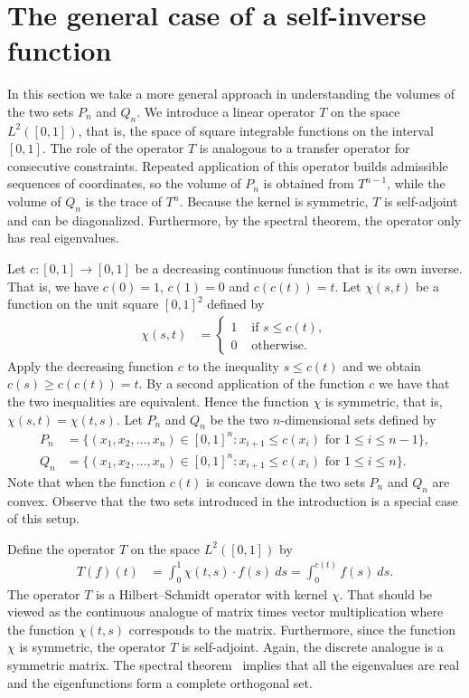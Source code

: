 \documentclass[11pt,reqno]{amsart}
\theoremstyle{definition}
\numberwithin{equation}{section}
\begin{document}
\section{The general case of a self-inverse function}
\label{section_general}

In this section we take a more general approach in understanding the
volumes of the two sets $P_{n}$ and $Q_{n}$.
We introduce a linear operator $T$ on the space $L^{2}([0,1])$,
that is, the space of square integrable functions on the interval $[0,1]$.
The role of the operator $T$ is analogous to a transfer operator for consecutive constraints.
Repeated application of this operator builds admissible sequences of coordinates,
so the volume of $P_{n}$ is obtained from $T^{n-1}$,
while the volume of $Q_{n}$ is the trace of $T^{n}$.
Because the kernel is symmetric, $T$ is self-adjoint and can be diagonalized.
Furthermore, by the spectral theorem, the operator only has
real eigenvalues.


Let $c: [0,1] \longrightarrow [0,1]$ be a decreasing
continuous function that is its own inverse.
That is, we have
$c(0) = 1$,
$c(1) = 0$
and
$c(c(t)) = t$.
Let $\chi(s,t)$ be a function on
the unit square $[0,1]^{2}$ defined by
\begin{align*}
\chi(s,t)
& =
\begin{cases}
1 & \text{ if } s \leq c(t) , \\
0 & \text{ otherwise. }
\end{cases}
\end{align*}
Apply the decreasing function $c$ to the inequality $s \leq c(t)$
and we obtain $c(s) \geq c(c(t)) = t$. 
By a second application of the function $c$ we have that the two inequalities are equivalent.
Hence the function $\chi$ is symmetric,
that is,
$\chi(s,t) = \chi(t,s)$.
Let $P_{n}$ and $Q_{n}$ be the two $n$-dimensional sets
defined by
\begin{align*}
P_{n}
& =
\{(x_{1},x_{2}, \ldots, x_{n}) \in [0,1]^{n} :
x_{i+1} \leq c(x_{i}) \text{ for } 1 \leq i \leq n-1\} , \\
Q_{n}
& =
\{(x_{1},x_{2}, \ldots, x_{n}) \in [0,1]^{n} :
x_{i+1} \leq c(x_{i}) \text{ for } 1 \leq i \leq n\} .
\end{align*}
Note that when the function $c(t)$ is concave down
the two sets $P_{n}$ and $Q_{n}$ are convex.
Observe that the two sets introduced in the introduction is
a special case of this setup.

Define the operator $T$ on the space $L^{2}([0,1])$ by
\begin{align*}
T(f)(t)
& = 
\int_{0}^{1} \chi(t,s) \cdot f(s) \: ds 
=
\int_{0}^{c(t)} f(s) \: ds .
\end{align*}
The operator $T$ is a Hilbert--Schmidt operator
with kernel $\chi$.
That should be viewed as the continuous analogue
of matrix times vector multiplication
where the function $\chi(t,s)$ corresponds to the matrix.
Furthermore, since the function $\chi$ is symmetric,
the operator $T$ is self-adjoint.
Again, the discrete analogue is a symmetric matrix.
The spectral theorem~\cite[XIII.4 Theorem~2]{Dunford_Schwartz}
implies that
all the eigenvalues are real and
the eigenfunctions form a complete orthogonal set.
\end{document}
